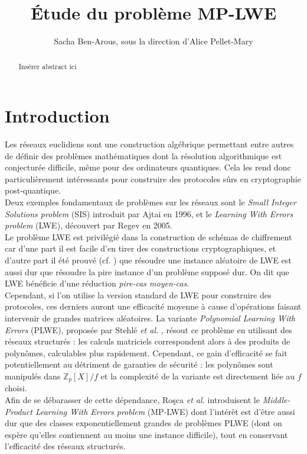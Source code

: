 \documentclass[11pt,a4paper]{article}
\title{\textbf{Étude du problème MP-LWE}}
\date{}
\author{Sacha Ben-Arous, sous la direction d'Alice Pellet-Mary}
\begin{document}
\maketitle 
\begin{abstract}
Insérer abstract ici \\
\end{abstract}
\tableofcontents
\newpage
\section{Introduction}
\; Les réseaux euclidiens sont une construction algébrique permettant entre autres de définir des problèmes mathématiques dont la résolution algorithmique est conjecturée difficile, même pour des ordinateurs quantiques. Cela les rend donc particulièrement intéressants pour construire des protocoles sûrs en cryptographie post-quantique. \\
Deux exemples fondamentaux de problèmes sur les réseaux sont le \textit{Small Integer Solutions problem} (SIS) introduit par Ajtai en 1996, et le \textit{Learning With Errors problem} (LWE), découvert par Regev en 2005. \\
Le problème LWE est privilégié dans la construction de schémas de chiffrement car d'une part il est facile d'en tirer des constructions cryptographiques, et d'autre part il été prouvé (cf. \cite{wcac}) que résoudre une instance aléatoire de LWE est aussi dur que résoudre la pire instance d'un problème supposé dur. On dit que LWE bénéficie d'une réduction \textit{pire-cas moyen-cas}. \\
Cependant, si l'on utilise la version standard de LWE pour construire des protocoles, ces derniers auront une efficacité moyenne à cause d'opérations faisant intervenir de grandes matrices aléatoires. La variante \textit{Polynomial Learning With Errors} (PLWE), proposée par Stehlé \textit{et al.} \cite{plwe}, résout ce problème en utilisant des réseaux structurés : les calculs matriciels correspondent alors à des produits de polynômes, calculables plus rapidement. Cependant, ce gain d'efficacité se fait potentiellement au détriment de garanties de sécurité : les polynômes sont manipulés dans $\mathbb{Z}_p[X]/f$ et la complexité de la variante est directement liée au $f$ choisi. \\
Afin de se débarasser de cette dépendance, Roşca \textit{et al.} introduisent le \textit{Middle-Product Learning With Errors problem} (MP-LWE) \cite{mplwe} dont l'intérêt est d'être aussi dur que des classes exponentiellement grandes de problèmes PLWE (dont on espère qu'elles contiennent au moins une instance difficile), tout en conservant l'efficacité des réseaux structurés. \\
\end{document}
